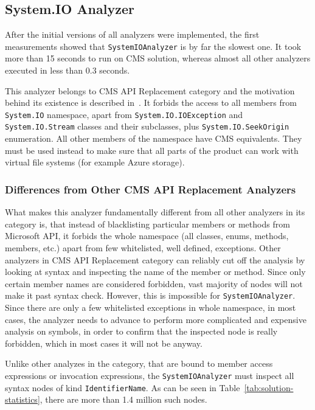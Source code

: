 \documentclass[
  digital, %
  table,   %
  lof,     %
  lot,     %
  oneside,
]{fithesis3}
\begin{document}
\subsection{System.IO Analyzer}
After the initial versions of all analyzers were implemented, the first measurements showed that \texttt{SystemIOAnalyzer} is by far the slowest one. It took more than 15 seconds to run on CMS solution, whereas almost all other analyzers executed in less than 0.3 seconds.

This analyzer belongs to CMS API Replacement category and the motivation behind its existence is described in~\cite{system-io-motivation}. It forbids the access to all members from \texttt{System.IO} namespace, apart from \texttt{System.IO.IOException} and \texttt{System.IO.Stream} classes and their subclasses, plus \texttt{System.IO.SeekOrigin} enumeration. All other members of the namespace have CMS equivalents. They must be used instead to make sure that all parts of the product can work with virtual file systems (for example Azure storage).

\subsubsection{\textbf{Differences from Other CMS API Replacement Analyzers}}
What makes this analyzer fundamentally different from all other analyzers in its category is, that instead of blacklisting particular members or methods from Microsoft API, it forbids the whole namespace (all classes, enums, methods, members, etc.) apart from few whitelisted, well defined, exceptions. Other analyzers in CMS API Replacement category can reliably cut off the analysis by looking at syntax and inspecting the name of the member or method. Since only certain member names are considered forbidden, vast majority of nodes will not make it past syntax check. However, this is impossible for \texttt{SystemIOAnalyzer}. Since there are only a few whitelisted exceptions in whole namespace, in most cases, the analyzer needs to advance to perform more complicated and expensive analysis on symbols, in order to confirm that the inspected node is really forbidden, which in most cases it will not be anyway.

Unlike other analyzes in the category, that are bound to member access expressions or invocation expressions, the \texttt{SystemIOAnalyzer} must inspect all syntax nodes of kind \texttt{IdentifierName}. As can be seen in Table~\ref{tab:solution-statistics}, there are more than 1.4 million such nodes. 
\end{document}
